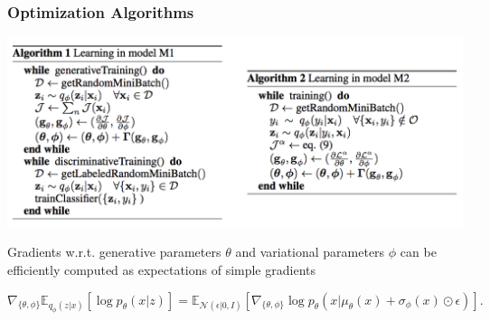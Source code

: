 \documentclass{beamer}
\begin{document}
\begin{frame}
  \frametitle{Optimization Algorithms}
  \includegraphics[scale=0.5]{learningModel}

  Gradients w.r.t. generative parameters $\theta$ and variational
  parameters $\phi$ can be efficiently computed as expectations of
  simple gradients\footnotemark

    \[
  \nabla_{\{\theta, \phi\}} \mathbb{E}_{q_\phi (z|x)}
        [\log p_\theta (x|z)] = \mathbb{E}_{\mathcal{N}(\epsilon | 0, I)}
        [\nabla_{\{\theta, \phi\}} \log p_\theta (x |\mu_\theta (x)
          + \sigma_\phi (x) \odot \epsilon)]. 
        \]

\end{frame}
\end{document}
